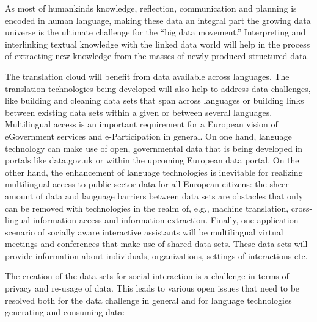 \documentclass[10pt, plain]{../../metanetpaper}
\begin{document}
\begin{multicols}{2}
As most of humankinds knowledge, reflection, communication and planning is encoded in human language, making these data an integral part the growing data universe is the ultimate challenge for the “big data movement.”  Interpreting and interlinking textual knowledge with the linked data world will help in the process of extracting new knowledge from the masses of newly produced structured data. 

The translation cloud will benefit from data available across languages. The translation technologies being developed will also help to address data challenges, like building and cleaning data sets that span across languages or building links between existing data sets within a given or between several languages. Multilingual access is an important requirement for a European vision of eGovernment services and e-Participation in general. On one hand, language technology can make use of open, governmental data that is being developed in portals like data.gov.uk or within the upcoming European data portal. On the other hand, the enhancement of language technologies is inevitable for realizing multilingual access to public sector data for all European citizens: the sheer amount of data and language barriers between data sets are obstacles that only can be removed with technologies in the realm of, e.g., machine translation, cross-lingual information access and information extraction. Finally,  one application scenario of socially aware interactive assistants will be multilingual virtual meetings and conferences that make use of shared data sets. These data sets will provide information about individuals, organizations, settings of interactions etc.

The creation of the data sets for social interaction is a challenge in terms of privacy and re-usage of data. This leads to various open issues that need to be resolved both for the data challenge in general and for language technologies generating and consuming data:


\end{multicols}
\end{document}
